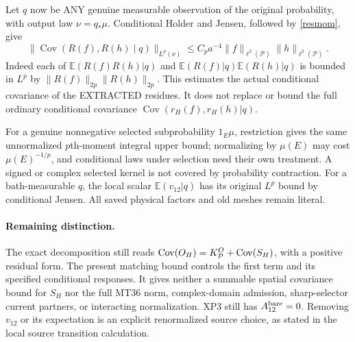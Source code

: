 \documentclass[11pt]{article}
\newcommand{\E}{\mathbb E}
\newcommand{\Cov}{\operatorname{Cov}}
\begin{document}
Let $q$ now be ANY genuine measurable observation of the original probability, with
output law $\nu=q_*\mu$. Conditional Holder and Jensen, followed by \eqref{resmom}, give
\begin{equation}\label{outcov}
 \|\Cov(R(f),R(h)\mid q)\|_{L^p(\nu)}
 \le C_p a^{-4}\|f\|_{\ell^2(\mathcal P)}\|h\|_{\ell^2(\mathcal P)}.
\end{equation}
Indeed each of $\E(R(f)R(h)|q)$ and $\E(R(f)|q)\E(R(h)|q)$ is bounded in
$L^p$ by $\|R(f)\|_{2p}\|R(h)\|_{2p}$. This estimates the actual conditional covariance
of the EXTRACTED residues. It does not replace or bound the full ordinary conditional
covariance $\Cov(r_H(f),r_H(h)|q)$.

For a genuine nonnegative selected subprobability $1_E\mu$, restriction gives the same
unnormalized $p$th-moment integral upper bound; normalizing by $\mu(E)$ may cost
$\mu(E)^{-1/p}$, and conditional laws under selection need their own treatment.
A signed or complex selected kernel is not covered by probability contraction.
For a bath-measurable $q$, the local scalar $\E(v_{12}|q)$ has its original $L^p$ bound
by conditional Jensen. All saved physical factors and old meshes remain literal.

\paragraph{Remaining distinction.}
The exact decomposition still reads
$\Cov(O_H)=K_{\cal P}^{O}+\Cov(S_H)$, with a positive residual form.
The present matching bound controls the first term and its specified conditional responses.
It gives neither a summable spatial covariance bound for $S_H$ nor the full MT36 norm,
complex-domain admission, sharp-selector current partners, or interacting normalization.
XP3 still has $A_{12}^{\rm bare}=0$. Removing $v_{12}$ or its expectation is an explicit
renormalized source choice, as stated in the local source transition calculation.
\end{document}
